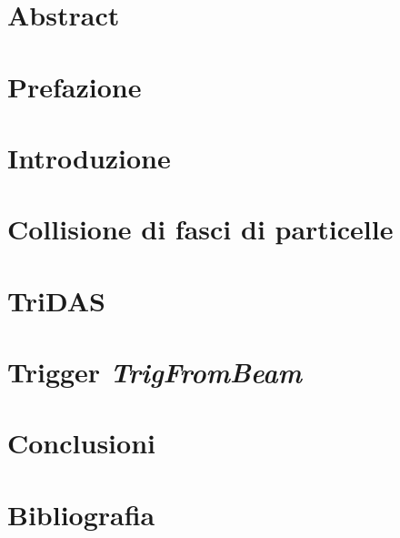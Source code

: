 \documentclass[12pt, a4paper, twoside]{report}
\begin{document}
\begin{titlepage}
    
\end{titlepage}
\setcounter{page}{1}
\chapter*{Abstract}

\chapter*{Prefazione}

\tableofcontents{}
\newpage
\chapter*{Introduzione}

\chapter{Collisione di fasci di particelle}

\chapter{TriDAS}

\chapter{Trigger \emph{TrigFromBeam}}

\chapter*{Conclusioni}

\chapter*{Bibliografia}

\end{document}
